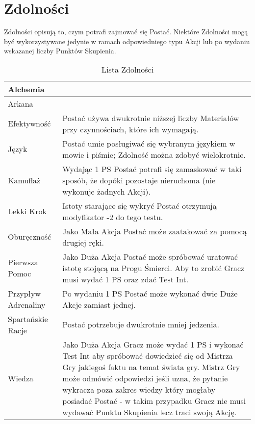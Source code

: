 \documentclass[10pt,a4paper]{book}
\begin{document}
\section{Zdolności}
\begin{multicols}{2}

Zdolności opisują to, czym potrafi zajmować się Postać. Niektóre Zdolności mogą być wykorzystywane jedynie w ramach odpowiedniego typu Akcji lub po wydaniu wskazanej liczby Punktów Skupienia.

\end{multicols}


\begin{table}
\caption{Lista Zdolności}
\centering
\begin{tabular}{ | m{50mm} | m{100mm} | }
	\hline
		Alchemia &  \\
	\hline
		Arkana &  \\
	\hline
		Efektywność & Postać używa dwukrotnie niższej liczby Materiałów przy czynnościach, które ich wymagają. \\
	\hline
		Język & Postać umie posługiwać się wybranym językiem w mowie i piśmie; Zdolność można zdobyć wielokrotnie. \\
	\hline
		Kamuflaż & Wydając 1 PS Postać potrafi się zamaskować w taki sposób, że dopóki pozostaje nieruchoma (nie wykonuje żadnych Akcji). \\
	\hline
		Lekki Krok & Istoty starające się wykryć Postać otrzymują modyfikator -2 do tego testu. \\
	\hline
		Oburęczność & Jako Mała Akcja Postać może zaatakować za pomocą drugiej ręki. \\
	\hline
		Pierwsza Pomoc & Jako Duża Akcja Postać może spróbować uratować istotę stojącą na Progu Śmierci. Aby to zrobić Gracz musi wydać 1 PS oraz zdać Test Int. \\
	\hline
		Przypływ Adrenaliny & Po wydaniu 1 PS Postać może wykonać dwie Duże Akcje zamiast jednej. \\
	\hline
		Spartańskie Racje & Postać potrzebuje dwukrotnie mniej jedzenia. \\
	\hline
		Wiedza & Jako Duża Akcja Gracz może wydać 1 PS i wykonać Test Int aby spróbować dowiedzieć się od Mistrza Gry jakiegoś faktu na temat świata gry. Mistrz Gry może odmówić odpowiedzi jeśli uzna, że pytanie wykracza poza zakres wiedzy który mogłaby posiadać Postać - w takim przypadku Gracz nie musi wydawać Punktu Skupienia lecz traci swoją Akcję. \\
	\hline
\end{tabular}
\label{zdolnosci:1}
\end{table}
\end{document}
